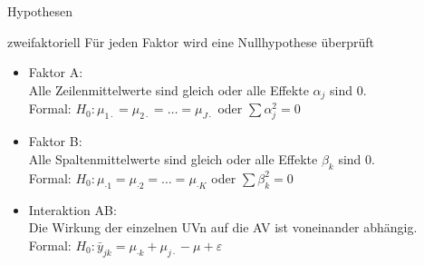\documentclass{beamer}
\begin{document}
		\begin{frame}{Hypothesen}
			\begin{block}{zweifaktoriell}
				Für jeden Faktor wird eine Nullhypothese überprüft
				\begin{itemize}\itemsep=1ex
					\item Faktor A:\\
					Alle Zeilenmittelwerte sind gleich oder alle Effekte $\alpha_j$ sind 0.\\
					Formal: $H_0: \mu_{1\cdot} = \mu_{2\cdot} = \dots = \mu_{J\cdot}$ oder $\sum\alpha_j^2=0$
					\item Faktor B:\\
					Alle Spaltenmittelwerte sind gleich oder alle Effekte $\beta_k$ sind 0.\\
					Formal: $H_0: \mu_{\cdot1} = \mu_{\cdot2} = \dots = \mu_{\cdot K}$ oder $\sum\beta_k^2=0$
					\item Interaktion AB:\\
					Die Wirkung der einzelnen UVn auf die AV ist voneinander abhängig.\\
					Formal: $H_0: \bar{y}_{jk} = \mu_{\cdot k} + \mu_{j\cdot} - \mu + \varepsilon$
				\end{itemize}
			\end{block}
		\end{frame}
\end{document}
